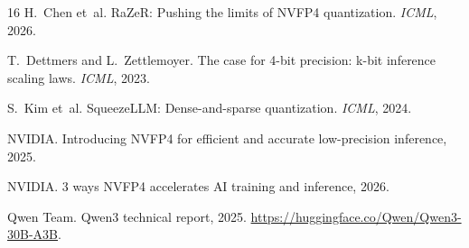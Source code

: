 \documentclass[11pt,a4paper]{article}
\begin{document}
\begin{thebibliography}{16}
H.~Chen et~al. {RaZeR}: Pushing the limits of {NVFP4} quantization. \emph{ICML}, 2026.

T.~Dettmers and L.~Zettlemoyer. The case for 4-bit precision: k-bit inference scaling laws. \emph{ICML}, 2023.

S.~Kim et~al. {SqueezeLLM}: Dense-and-sparse quantization. \emph{ICML}, 2024.

{NVIDIA}. Introducing {NVFP4} for efficient and accurate low-precision inference, 2025.

{NVIDIA}. 3 ways {NVFP4} accelerates {AI} training and inference, 2026.

{Qwen Team}. Qwen3 technical report, 2025. \url{https://huggingface.co/Qwen/Qwen3-30B-A3B}.
\end{thebibliography}
\end{document}
